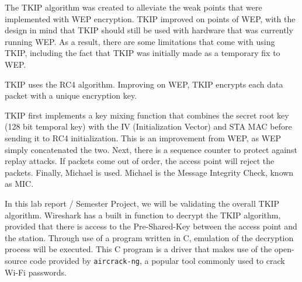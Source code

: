 \documentclass[main.tex]{subfiles}
\begin{document}
\hfill \break
The TKIP algorithm was created to alleviate the weak points that were implemented with WEP encryption. TKIP improved on points of WEP, with the design in mind that TKIP should still be used with hardware that was currently running WEP. As a result, there are some limitations that come with using TKIP, including the fact that TKIP was initially made as a temporary fix to WEP. 

TKIP uses the RC4 algorithm. Improving on WEP, TKIP encrypts each data packet with a unique encryption key. 

TKIP first implements a key mixing function that combines the secret root key (128 bit temporal key)  with the IV (Initialization Vector) and STA MAC before sending it to RC4 initialization. This is an improvement from WEP, as WEP simply concatenated the two. Next, there is a sequence counter to protect against replay attacks. If packets come out of order, the access point will reject the packets. Finally, Michael is used. Michael is the Message Integrity Check, known as MIC.

In this lab report / Semester Project, we will be validating the overall TKIP algorithm. Wireshark has a built in function to decrypt the TKIP algorithm, provided that there is access to the Pre-Shared-Key between the access point and the station. Through use of a program written in C, emulation of the decryption process will be executed. This C program is a driver that makes use of the open-source code provided by \texttt{aircrack-ng}, a popular tool commonly used to crack Wi-Fi passwords.
\end{document}
